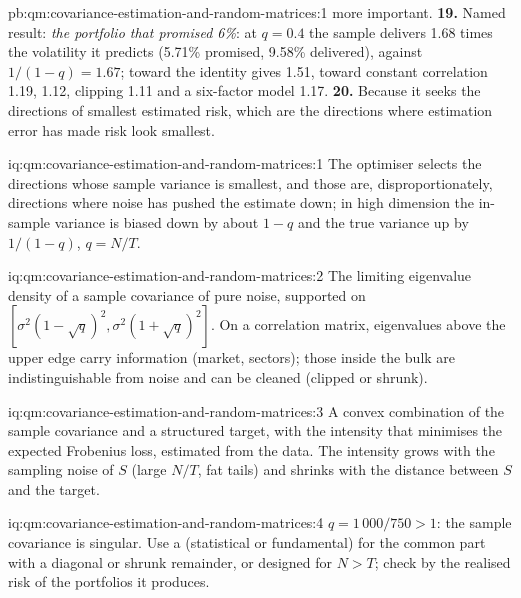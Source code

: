 \begin{solution}{pb:qm:covariance-estimation-and-random-matrices:1}
more important.
\textbf{19.} Named result: \emph{the portfolio that promised 6\%}: at $q = 0.4$ the sample  delivers 1.68 times the volatility it predicts (5.71\% promised, 9.58\%
delivered), against $1/(1 - q) = 1.67$;  toward the identity gives 1.51, toward constant correlation 1.19,  1.12, clipping 1.11 and a six-factor model 1.17.
\textbf{20.} Because it seeks the directions of smallest estimated risk, which are the directions where estimation error has made risk look smallest.
\end{solution}

\begin{solution}{iq:qm:covariance-estimation-and-random-matrices:1}
The optimiser selects the directions whose sample variance is smallest, and those are, disproportionately, directions where noise has pushed the estimate down; in high dimension the
in-sample variance is biased down by about $1 - q$ and the true variance up by $1/(1 - q)$, $q = N/T$.
\end{solution}

\begin{solution}{iq:qm:covariance-estimation-and-random-matrices:2}
The limiting eigenvalue density of a sample covariance of pure noise, supported on $[\sigma^2(1 - \sqrt q)^2, \sigma^2(1 + \sqrt q)^2]$. On a correlation matrix, eigenvalues above the upper edge
carry information (market, sectors); those inside the bulk are indistinguishable from noise and can be cleaned (clipped or shrunk).
\end{solution}

\begin{solution}{iq:qm:covariance-estimation-and-random-matrices:3}
A convex combination of the sample covariance and a structured target, with the intensity that minimises the expected Frobenius loss, estimated from the data. The intensity grows with the
sampling noise of $S$ (large $N/T$, fat tails) and shrinks with the distance between $S$ and the target.
\end{solution}

\begin{solution}{iq:qm:covariance-estimation-and-random-matrices:4}
$q = 1\,000/750 > 1$: the sample covariance is singular. Use a  (statistical or fundamental) for the common part with a diagonal or shrunk remainder, or 
designed for $N > T$; check by the realised risk of the portfolios it produces.
\end{solution}

